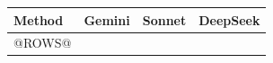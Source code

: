 \begin{tabular}{lccc}
\toprule
Method & Gemini & Sonnet & DeepSeek\\
\midrule
@ROWS@
\bottomrule
\end{tabular}
